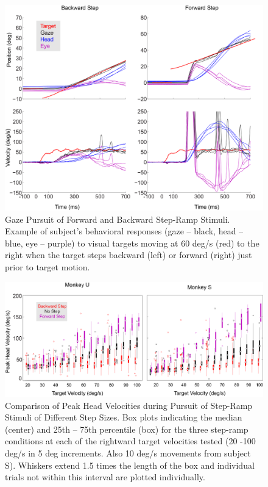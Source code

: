 \documentclass[12pt]{article}
\begin{document}
\begin{figure}
\centering
\includegraphics[width=0.9\linewidth]{./figs/StepRampExample}
\caption[Step-Ramp Behavior]{Gaze Pursuit of Forward and Backward Step-Ramp Stimuli. Example of subject's behavioral responses (gaze – black, head – blue, eye – purple) to visual targets moving at 60 deg/s (red) to the right when the target steps backward (left) or forward (right) just prior to target motion.}
\label{fig:StepRampExample}
\end{figure}

\begin{figure}
\centering
\includegraphics[width=0.9\linewidth]{./figs/StepRampBoxplot}
\caption[Step-Ramp Peak Head Velocity]{Comparison of Peak Head Velocities during Pursuit of Step-Ramp Stimuli of Different Step Sizes. Box plots indicating the median (center) and 25th – 75th percentile (box) for the three step-ramp conditions at each of the rightward target velocities tested (20 -100 deg/s in 5 deg increments. Also 10 deg/s movements from subject S). Whiskers extend 1.5 times the length of the box and individual trials not within this interval are plotted individually.}
\label{fig:StepRampBoxplot}
\end{figure}
\end{document}
